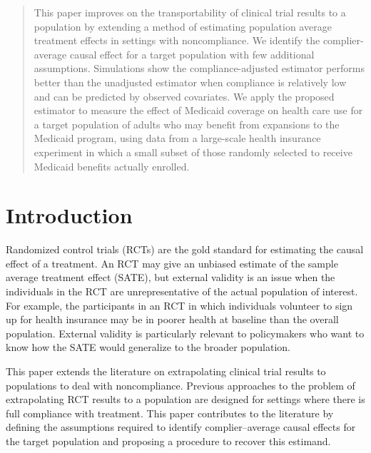 \documentclass[hidelinks,12pt]{article}
\begin{document}
\begin{singlespace} %
\maketitle  

\thispagestyle{empty}
\begin{abstract}  
\noindent 
This paper {\color{red} improves on the transportability of clinical trial results to a population by extending a method of estimating population average treatment effects in settings with noncompliance.} We identify the complier-average causal effect for {\color{red}a} target population with few additional assumptions. Simulations show the compliance-adjusted estimator performs better than the unadjusted estimator when compliance is relatively low and can be predicted by observed covariates. We apply the proposed estimator to measure the effect of Medicaid coverage on health care use for a target population of adults who may benefit from expansions to the Medicaid program{\color{red}, using} data from a large-scale health insurance experiment in which a small subset of those randomly selected to receive Medicaid benefits actually enrolled.
\end{abstract}	

\end{singlespace}
\pagebreak
\setcounter{page}{1} %

\vspace{20mm}

\section{Introduction}\label{intro}
Randomized control trials (RCTs) are the gold standard for estimating the causal effect of a treatment. An RCT may give an unbiased estimate of the sample average treatment effect (SATE), but external validity is an issue when the individuals in the RCT are unrepresentative of the actual population of interest. For example, the participants in an RCT in which individuals volunteer to sign up for health insurance may be in poorer health at baseline than the overall population. External validity is particularly relevant to policymakers who want to know how the SATE would generalize to the broader population. 

{\color{red}This paper extends the literature on extrapolating clinical trial results to populations to deal with noncompliance. Previous approaches to the problem of extrapolating RCT results to a population \citep{ImaKinStu08, stuart2011use, Hartman} are designed for settings where there is full compliance with treatment. This paper contributes to the literature by defining the assumptions required to identify complier--average causal effects for the target population and proposing a procedure to recover this estimand.} 
\end{document}
